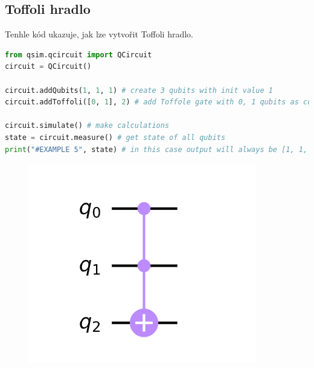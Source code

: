 \documentclass[11pt]{article}
\begin{document}
\subsection{Toffoli hradlo}
Tenhle kód ukazuje, jak lze vytvořit Toffoli hradlo.
\begin{lstlisting}[language=Python, caption=Toffoli gate]
from qsim.qcircuit import QCircuit
circuit = QCircuit()

circuit.addQubits(1, 1, 1) # create 3 qubits with init value 1
circuit.addToffoli([0, 1], 2) # add Toffole gate with 0, 1 qubits as control and 2 qubit as target

circuit.simulate() # make calculations
state = circuit.measure() # get state of all qubits
print("#EXAMPLE 5", state) # in this case output will always be [1, 1, 0]
\end{lstlisting}
\begin{figure}[H]
    \includegraphics[scale=.7]{toffoli_scheme}
    \centering
\end{figure}
\end{document}
